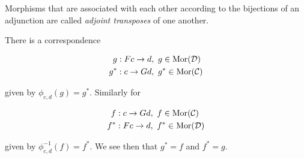 \begin{frame}
Morphisms that are associated with each other according to the bijections of an adjunction are called {\it adjoint transposes} of one another. 

There is a correspondence
\begin{block}{}
\abovedisplayskip=0pt
\begin{align*}
g &: Fc \rightarrow d, \,\, g \in \mathop{\rm Mor}\nolimits(\mathcal{D})\\
g^* &: c \rightarrow Gd, \,\, g^* \in \mathop{\rm Mor}\nolimits(\mathcal{C})
\end{align*}
\end{block}
given by $\phi_{c,d}(g) = g^*$. 
Similarly for 
\begin{block}{}
\abovedisplayskip=0pt
\begin{align*}
f &: c \rightarrow Gd, \,\, f \in \mathop{\rm Mor}\nolimits(\mathcal{C})\\
f^* &: Fc \rightarrow d, \,\, f^* \in \mathop{\rm Mor}\nolimits(\mathcal{D}) 
\end{align*}
\end{block}
given by $\phi_{c,d}^{-1}(f) = f^*$. 
We see then that $g^* = f$ and $f^* = g$.
\end{frame}